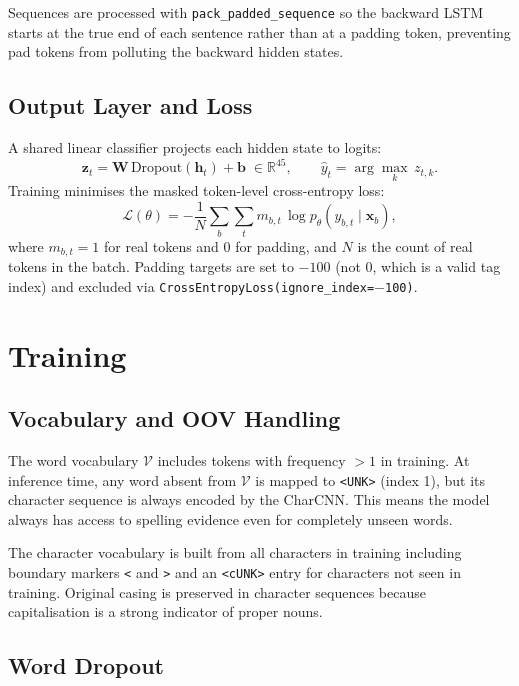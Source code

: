 \documentclass[11pt]{article}
\begin{document}
Sequences are processed with \texttt{pack\_padded\_sequence} so the backward
LSTM starts at the true end of each sentence rather than at a padding token,
preventing pad tokens from polluting the backward hidden states.

\subsection{Output Layer and Loss}

A shared linear classifier projects each hidden state to logits:
\begin{equation}
  \mathbf{z}_t = \mathbf{W}\,\mathrm{Dropout}(\mathbf{h}_t) + \mathbf{b}
    \;\in \mathbb{R}^{45},
  \qquad
  \hat{y}_t = \arg\max_k\, z_{t,k}.
\end{equation}
Training minimises the masked token-level cross-entropy loss:
\begin{equation}
  \mathcal{L}(\theta) =
    -\frac{1}{N} \sum_{b} \sum_{t} m_{b,t}\,
    \log p_\theta(y_{b,t} \mid \mathbf{x}_b),
\end{equation}
where $m_{b,t} = 1$ for real tokens and $0$ for padding, and $N$ is the
count of real tokens in the batch.  Padding targets are set to $-100$
(not $0$, which is a valid tag index) and excluded via
\texttt{CrossEntropyLoss(ignore\_index=$-$100)}.

\section{Training}

\subsection{Vocabulary and OOV Handling}

The word vocabulary $\mathcal{V}$ includes tokens with frequency $> 1$ in
training.  At inference time, any word absent from $\mathcal{V}$ is mapped
to \texttt{<UNK>} (index 1), but its character sequence is always encoded
by the CharCNN.  This means the model always has access to spelling evidence
even for completely unseen words.

The character vocabulary is built from all characters in training including
boundary markers \texttt{<} and \texttt{>} and an \texttt{<cUNK>} entry for
characters not seen in training.  Original casing is preserved in character
sequences because capitalisation is a strong indicator of proper nouns.

\subsection{Word Dropout}
\end{document}
